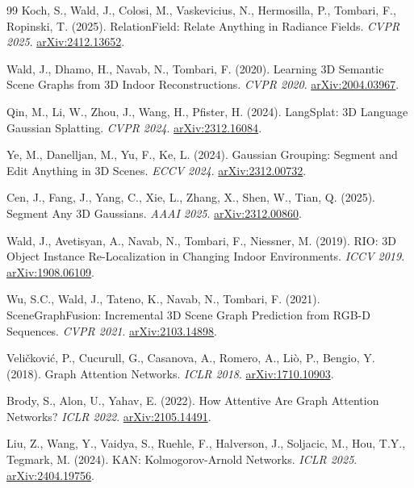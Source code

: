\documentclass[sn-mathphys,Numbered]{sn-jnl}
\begin{document}
\begin{thebibliography}{99}
 Koch, S., Wald, J., Colosi, M., Vaskevicius, N., Hermosilla, P., Tombari, F., Ropinski, T. (2025). RelationField: Relate Anything in Radiance Fields. \textit{CVPR 2025}. \href{https://arxiv.org/abs/2412.13652}{arXiv:2412.13652}.

 Wald, J., Dhamo, H., Navab, N., Tombari, F. (2020). Learning 3D Semantic Scene Graphs from 3D Indoor Reconstructions. \textit{CVPR 2020}. \href{https://arxiv.org/abs/2004.03967}{arXiv:2004.03967}.

 Qin, M., Li, W., Zhou, J., Wang, H., Pfister, H. (2024). LangSplat: 3D Language Gaussian Splatting. \textit{CVPR 2024}. \href{https://arxiv.org/abs/2312.16084}{arXiv:2312.16084}.

 Ye, M., Danelljan, M., Yu, F., Ke, L. (2024). Gaussian Grouping: Segment and Edit Anything in 3D Scenes. \textit{ECCV 2024}. \href{https://arxiv.org/abs/2312.00732}{arXiv:2312.00732}.

 Cen, J., Fang, J., Yang, C., Xie, L., Zhang, X., Shen, W., Tian, Q. (2025). Segment Any 3D Gaussians. \textit{AAAI 2025}. \href{https://arxiv.org/abs/2312.00860}{arXiv:2312.00860}.

 Wald, J., Avetisyan, A., Navab, N., Tombari, F., Niessner, M. (2019). RIO: 3D Object Instance Re-Localization in Changing Indoor Environments. \textit{ICCV 2019}. \href{https://arxiv.org/abs/1908.06109}{arXiv:1908.06109}.

 Wu, S.C., Wald, J., Tateno, K., Navab, N., Tombari, F. (2021). SceneGraphFusion: Incremental 3D Scene Graph Prediction from RGB-D Sequences. \textit{CVPR 2021}. \href{https://arxiv.org/abs/2103.14898}{arXiv:2103.14898}.

 Veli\v{c}kovi\'{c}, P., Cucurull, G., Casanova, A., Romero, A., Li\`{o}, P., Bengio, Y. (2018). Graph Attention Networks. \textit{ICLR 2018}. \href{https://arxiv.org/abs/1710.10903}{arXiv:1710.10903}.

 Brody, S., Alon, U., Yahav, E. (2022). How Attentive Are Graph Attention Networks? \textit{ICLR 2022}. \href{https://arxiv.org/abs/2105.14491}{arXiv:2105.14491}.

 Liu, Z., Wang, Y., Vaidya, S., Ruehle, F., Halverson, J., Soljacic, M., Hou, T.Y., Tegmark, M. (2024). KAN: Kolmogorov-Arnold Networks. \textit{ICLR 2025}. \href{https://arxiv.org/abs/2404.19756}{arXiv:2404.19756}.


\end{thebibliography}
\end{document}

